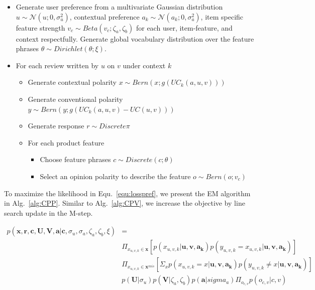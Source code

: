 \documentclass[preprint,12pt]{elsarticle}
\newcommand{\feedback}{\mathbf{x}}
\newcommand{\response}{\mathbf{r}}
\begin{document}
\begin{itemize}
	\item Generate user preference from a multivariate Gaussian distribution $u\sim \mathcal{N}(u;0,\sigma_u^2)$, contextual preference $a_k\sim \mathcal{N}(a_k;0,\sigma_a^2)$, item specific feature strength $v_c \sim Beta(v_c;\zeta_a,\zeta_b)$ for each user, item-feature, and context respectfully. Generate global vocabulary distribution over the feature phrases $\theta\sim Dirichlet(\theta;\xi)$.
	\item For each review written by $u$ on $v$ under context $k$
	\begin{itemize}
	\item Generate contextual polarity $x\sim Bern(x;g(UC_k(a,u,v)))$
	\item Generate conventional polarity $y\sim Bern(y;g(UC_k(a,u,v)-UC(u,v)))$
	\item Generate response $r \sim Discrete{\pi}$
	\item For each product feature
	\begin{itemize}
	\item Choose feature phrases $c\sim Discrete(c;\theta)$
	\item Select an opinion polarity to describe the feature $o \sim Bern(o;v_c)$
	\end{itemize}
	\end{itemize}
\end{itemize}

To maximize the likelihood in Equ.~\ref{equ:losspref}, we present the EM algorithm in Alg.~\ref{alg:CPP}. Similar to Alg.~\ref{alg:CPV}, we increase the objective by line search update in the M-step.

\begin{eqnarray}\label{equ:losspref}
 p(\feedback,\response,\mathbf{c},\mathbf{U},\mathbf{V},\mathbf{a}|\mathbf{c},\sigma_u,\sigma_a,\zeta_a,\zeta_b,\xi) & =  \\\nonumber
& \Pi_{x_{u,v,k}\in \feedback}[p(x_{u,v,k}|\mathbf{u,v,a_k})p(y_{u,v,k}=x_{u,v,k}|\mathbf{u,v,a_k})] \\\nonumber
&\Pi_{x_{u,v,k}\in \feedback^{mis}}[\Sigma_x p(x_{u,v,k}=x|\mathbf{u,v,a_k})p(y_{u,v,k}\neq x|\mathbf{u,v,a_k})] \\\nonumber
&p(\mathbf{U}|\sigma_u)p(\mathbf{V}|\zeta_a,\zeta_b)p(\mathbf{a}|sigma_a)\Pi_{o_{c,v}} p(o_{c,v}|c,v)
\end{eqnarray}
\end{document}
